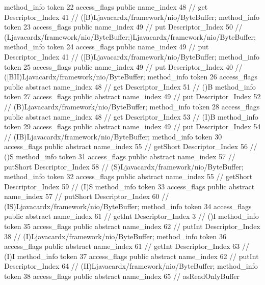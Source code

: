 {{{{{				}
				method_info {
					token	22
					access_flags	public
					name_index	48		// get
					Descriptor_Index	41		// ([B)Ljavacardx/framework/nio/ByteBuffer;
				}
				method_info {
					token	23
					access_flags	public
					name_index	49		// put
					Descriptor_Index	50		// (Ljavacardx/framework/nio/ByteBuffer;)Ljavacardx/framework/nio/ByteBuffer;
				}
				method_info {
					token	24
					access_flags	public
					name_index	49		// put
					Descriptor_Index	41		// ([B)Ljavacardx/framework/nio/ByteBuffer;
				}
				method_info {
					token	25
					access_flags	public
					name_index	49		// put
					Descriptor_Index	40		// ([BII)Ljavacardx/framework/nio/ByteBuffer;
				}
				method_info {
					token	26
					access_flags	public abstract
					name_index	48		// get
					Descriptor_Index	51		// ()B
				}
				method_info {
					token	27
					access_flags	public abstract
					name_index	49		// put
					Descriptor_Index	52		// (B)Ljavacardx/framework/nio/ByteBuffer;
				}
				method_info {
					token	28
					access_flags	public abstract
					name_index	48		// get
					Descriptor_Index	53		// (I)B
				}
				method_info {
					token	29
					access_flags	public abstract
					name_index	49		// put
					Descriptor_Index	54		// (IB)Ljavacardx/framework/nio/ByteBuffer;
				}
				method_info {
					token	30
					access_flags	public abstract
					name_index	55		// getShort
					Descriptor_Index	56		// ()S
				}
				method_info {
					token	31
					access_flags	public abstract
					name_index	57		// putShort
					Descriptor_Index	58		// (S)Ljavacardx/framework/nio/ByteBuffer;
				}
				method_info {
					token	32
					access_flags	public abstract
					name_index	55		// getShort
					Descriptor_Index	59		// (I)S
				}
				method_info {
					token	33
					access_flags	public abstract
					name_index	57		// putShort
					Descriptor_Index	60		// (IS)Ljavacardx/framework/nio/ByteBuffer;
				}
				method_info {
					token	34
					access_flags	public abstract
					name_index	61		// getInt
					Descriptor_Index	3		// ()I
				}
				method_info {
					token	35
					access_flags	public abstract
					name_index	62		// putInt
					Descriptor_Index	38		// (I)Ljavacardx/framework/nio/ByteBuffer;
				}
				method_info {
					token	36
					access_flags	public abstract
					name_index	61		// getInt
					Descriptor_Index	63		// (I)I
				}
				method_info {
					token	37
					access_flags	public abstract
					name_index	62		// putInt
					Descriptor_Index	64		// (II)Ljavacardx/framework/nio/ByteBuffer;
				}
				method_info {
					token	38
					access_flags	public abstract
					name_index	65		// asReadOnlyBuffer
}}}}}
